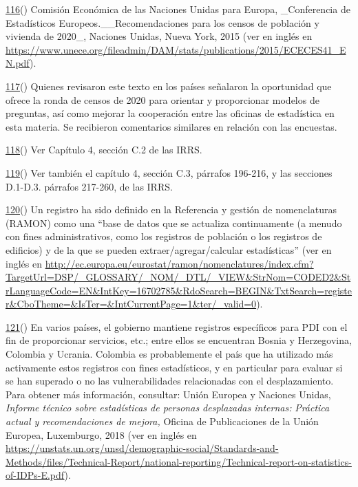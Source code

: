 \documentclass[
]{book}
\begin{document}
\protect\hyperlink{sdfootnote116anc}{116}() Comisión Económica de las Naciones Unidas para Europa, \_Conferencia de Estadísticos Europeos.\_\_Recomendaciones para los censos de población y vivienda de 2020\_, Naciones Unidas, Nueva York, 2015 (ver en inglés en \url{https://www.unece.org/fileadmin/DAM/stats/publications/2015/ECECES41_EN.pdf}).

\protect\hyperlink{sdfootnote117anc}{117}() Quienes revisaron este texto en los países señalaron la oportunidad que ofrece la ronda de censos de 2020 para orientar y proporcionar modelos de preguntas, así como mejorar la cooperación entre las oficinas de estadística en esta materia. Se recibieron comentarios similares en relación con las encuestas.

\protect\hyperlink{sdfootnote118anc}{118}() Ver Capítulo 4, sección C.2 de las IRRS.

\protect\hyperlink{sdfootnote119anc}{119}() Ver también el capítulo 4, sección C.3, párrafos 196-216, y las secciones D.1-D.3. párrafos 217-260, de las IRRS.

\protect\hyperlink{sdfootnote120anc}{120}() Un registro ha sido definido en la Referencia y gestión de nomenclaturas (RAMON) como una ``base de datos que se actualiza continuamente (a menudo con fines administrativos, como los registros de población o los registros de edificios) y de la que se pueden extraer/agregar/calcular estadísticas'' (ver en inglés en \url{http://ec.europa.eu/eurostat/ramon/nomenclatures/index.cfm?TargetUrl=DSP/_GLOSSARY/_NOM/_DTL/_VIEW\&StrNom=CODED2\&StrLanguageCode=EN\&IntKey=16702785\&RdoSearch=BEGIN\&TxtSearch=register\&CboTheme=\&IsTer=\&IntCurrentPage=1\&ter/_valid=0}).

\protect\hyperlink{sdfootnote121anc}{121}() En varios países, el gobierno mantiene registros específicos para PDI con el fin de proporcionar servicios, etc.; entre ellos se encuentran Bosnia y Herzegovina, Colombia y Ucrania. Colombia es probablemente el país que ha utilizado más activamente estos registros con fines estadísticos, y en particular para evaluar si se han superado o no las vulnerabilidades relacionadas con el desplazamiento. Para obtener más información, consultar: Unión Europea y Naciones Unidas, \emph{Informe técnico sobre estadísticas de personas desplazadas internas:} \emph{Práctica actual y recomendaciones de mejora,} Oficina de Publicaciones de la Unión Europea, Luxemburgo, 2018 (ver en inglés en \url{https://unstats.un.org/unsd/demographic-social/Standards-and-Methods/files/Technical-Report/national-reporting/Technical-report-on-statistics-of-IDPs-E.pdf}).
\end{document}

